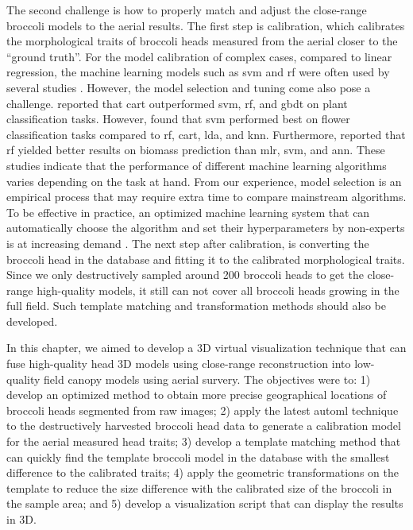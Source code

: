 The second challenge is how to properly match and adjust the close-range broccoli models to the aerial results. The first step is calibration, which calibrates the morphological traits of broccoli heads measured from the aerial closer to the ``ground truth''. For the model calibration of complex cases, compared to linear regression, the machine learning models such as \gls{svm} and \gls{rf} were often used by several studies \citep{nguyen_uav_2023, lu_assessment_2022}. However, the model selection and tuning come also pose a challenge. \citet{wang_landscape_2019} reported that \gls{cart} outperformed \gls{svm}, \gls{rf}, and \gls{gbdt} on plant classification tasks. However, \citet{han_drone_2021} found that \gls{svm} performed best on flower classification tasks compared to \gls{rf}, \gls{cart}, \gls{lda}, and \gls{knn}. Furthermore, \citet{han_modeling_2019} reported that \gls{rf} yielded better results on biomass prediction than \gls{mlr}, \gls{svm}, and \gls{ann}. These studies indicate that the performance of different machine learning algorithms varies depending on the task at hand. From our experience, model selection is an empirical process that may require extra time to compare mainstream algorithms. To be effective in practice, an optimized machine learning system that can automatically choose the algorithm and set their hyperparameters by non-experts is at increasing demand \citep{feurer_efficient_2015}. The next step after calibration, is converting the broccoli head in the database and fitting it to the calibrated morphological traits. Since we only destructively sampled around 200 broccoli heads to get the close-range high-quality models, it still can not cover all broccoli heads growing in the full field. Such template matching and transformation methods should also be developed.

In this chapter, we aimed to develop a 3D virtual visualization technique that can fuse high-quality head 3D models using close-range reconstruction into low-quality field canopy models using aerial survery. The objectives were to: 1) develop an optimized method to obtain more precise geographical locations of broccoli heads segmented from raw images; 2) apply the latest \gls{automl} technique to the destructively harvested broccoli head data to generate a calibration model for the aerial measured head traits; 3) develop a template matching method that can quickly find the template broccoli model in the database with the smallest difference to the calibrated traits; 4) apply the geometric transformations on the template to reduce the size difference with the calibrated size of the broccoli in the sample area; and 5) develop a visualization script that can display the results in 3D.

